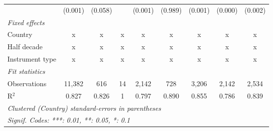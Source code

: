 \begin{table}[htbp]
\begin{tabular}{lcccccccc}
                                                                        & (0.001)       & (0.058)                   &              & (0.001)        & (0.989)          & (0.001)         & (0.000)         & (0.002)\\   
      \emph{Fixed effects}\\
      Country                                                           & x             & x                         & x            & x              & x                & x               & x               & x\\  
      Half decade                                                       & x             & x                         & x            & x              & x                & x               & x               & x\\  
      Instrument type                                                   & x             & x                         & x            & x              & x                & x               & x               & x\\  
      \midrule \emph{Fit statistics}\\
      Observations                                                      & 11,382        & 616                       & 14           & 2,142          & 728              & 3,206           & 2,142           & 2,534\\  
      R$^2$                                                             & 0.827         & 0.826                     & 1            & 0.797          & 0.890            & 0.855           & 0.786           & 0.839\\  
      \midrule
      \multicolumn{9}{l}{\emph{Clustered (Country) standard-errors in parentheses}}\\
      \multicolumn{9}{l}{\emph{Signif. Codes: ***: 0.01, **: 0.05, *: 0.1}}\\
   \end{tabular}
\end{table}



